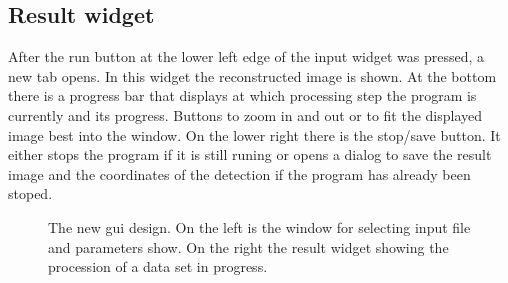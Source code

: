 \subsection{Result widget}
After the run button at the lower left edge of the input widget was pressed, a new tab opens. In this widget the reconstructed image is shown. At the bottom there is a progress bar that displays at which processing step the program is currently and its progress. Buttons to zoom in and out or to fit the displayed image best into the window. On the lower right there is the stop/save button. It either stops the program if it is still runing or opens a dialog to save the result image and the coordinates of the detection if the program has already been stoped.

\begin{figure}
\hfill
{}
	\caption{The new gui design. On the left is the window for selecting input file and parameters show. On the right the result widget showing the procession of a data set in progress.}
	\label{guiWidgets}	
\end{figure}

